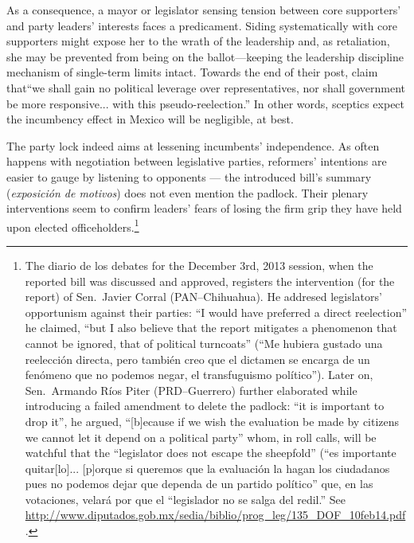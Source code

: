 \documentclass[letter,12pt]{article}
\begin{document}
As a consequence, a mayor or legislator sensing tension between core supporters' and party leaders' interests faces a predicament. Siding systematically with core supporters might expose her to the wrath of the leadership and, as retaliation, she may be prevented from being on the ballot---keeping the leadership discipline mechanism of single-term limits \citep{weldon.1997} intact. Towards the end of their post, \citet{merinoFierroZarkin2013Blog} claim that``we shall gain no political leverage over representatives, nor shall government be more responsive... with this pseudo-reelection.'' In other words, sceptics expect the incumbency effect in Mexico will be negligible, at best. 

The party lock indeed aims at lessening incumbents' independence. As often happens with negotiation between legislative parties, reformers' intentions are easier to gauge by listening to opponents --- the introduced bill's summary (\emph{exposición de motivos}) does not even mention the padlock. Their plenary interventions seem to confirm leaders' fears of losing the firm grip they have held upon elected officeholders.\footnote{The diario de los debates for the December 3rd, 2013 session, when the reported bill was discussed and approved, registers the intervention (for the report) of Sen.\ Javier Corral (PAN--Chihuahua). He addresed legislators' opportunism against their parties: ``I would have preferred a direct reelection'' he claimed, ``but I also believe that the report mitigates a phenomenon that cannot be ignored, that of political turncoats'' (``Me hubiera gustado una reelección directa, pero también creo que el dictamen se encarga de un fenómeno que no podemos negar, el transfuguismo político''). Later on, Sen.\ Armando Ríos Piter (PRD--Guerrero) further elaborated while introducing a failed amendment to delete the padlock: ``it is important to drop it'', he argued, ``[b]ecause if we wish the evaluation be made by citizens we cannot let it depend on a political party'' whom, in roll calls, will be watchful that the ``legislator does not escape the sheepfold'' (``es importante quitar[lo]... [p]orque si queremos que la evaluación la hagan los ciudadanos pues no podemos dejar que dependa de un partido político'' que, en las votaciones, velará por que el ``legislador no se salga del redil.'' See \url{http://www.diputados.gob.mx/sedia/biblio/prog_leg/135_DOF_10feb14.pdf}.}

\end{document}
